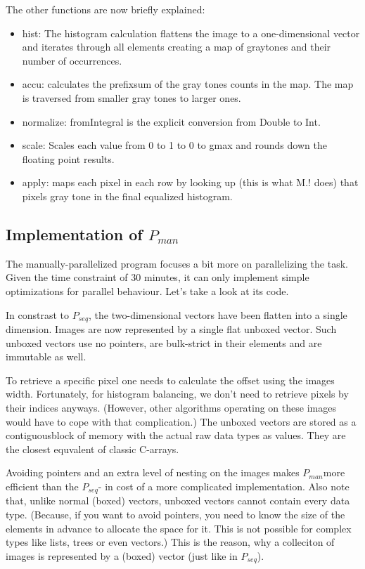 \documentclass{article}
\newcommand{\seq}[0]{$P_{seq}$}
\newcommand{\man}[0]{$P_{man}$}
\begin{document}
      The other functions are now briefly explained:
      \begin{itemize}
        \item hist: The histogram calculation flattens the image to a one-dimensional vector and 
          iterates through all elements creating a map of graytones and their number of occurrences.
        \item accu: calculates the prefixsum of the gray tones counts in the map.
          The map is traversed from smaller gray tones to larger ones.
        \item normalize: fromIntegral is the explicit conversion from Double to Int.
        \item scale: Scales each value from 0 to 1 to 0 to gmax and rounds down the floating point results.
        \item apply: maps each pixel in each row by looking up (this is what M.! does) that pixels gray tone in the final equalized histogram.
      \end{itemize}
      
    \newpage
    \subsection{Implementation of \man}
      The manually-parallelized program focuses a bit more on parallelizing
      the task. Given the time constraint of 30 minutes, it can only implement
      simple optimizations for parallel behaviour. Let's take a look at its code.      
      
      
      
      In constrast to \seq, the two-dimensional vectors have been
      flatten into a single dimension. Images are now represented
      by a single flat unboxed vector. Such unboxed vectors use no pointers,
      are bulk-strict in their elements and are immutable as well.
      
      To retrieve a specific pixel one needs to calculate
      the offset using the images width. Fortunately,
      for histogram balancing, we don't need to retrieve pixels by their indices anyways.
      (However, other algorithms operating on these images would have to cope with that complication.)
      The unboxed vectors are stored as a contiguousblock of memory with
      the actual raw data types as values. They are the closest equvalent of classic C-arrays.
      
      Avoiding pointers and an extra level of nesting on the images 
      makes \man more efficient than the \seq - in cost of a more complicated implementation.
      Also note that, unlike normal (boxed) vectors,
      unboxed vectors cannot contain every data type.
      (Because, if you want to avoid pointers, you need to know the size of the
      elements in advance to allocate the space for it. This is not possible for complex
      types like lists, trees or even vectors.)
      This is the reason, why a colleciton of images is represented by a
      (boxed) vector (just like in \seq).
      
\end{document}
